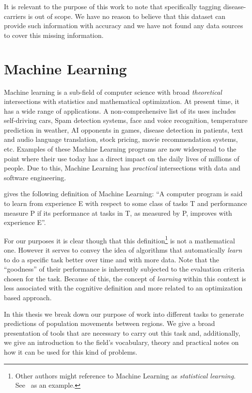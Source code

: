 It is relevant to the purpose of this work to note that specifically tagging disease-carriers is out of scope.
We have no reason to believe that this dataset can provide such information with accuracy and we have not found any data sources to cover this missing  information.

\section{Machine Learning}

Machine learning is a sub-field of computer science with broad \textit{theoretical} intersections with statistics and mathematical optimization.
At present time, it has a wide range of applications.
A non-comprehensive list of its uses includes self-driving cars, Spam detection systems, face and voice recognition, temperature prediction in weather, AI opponents in games, disease detection in patients, text and audio language translation, stock pricing, movie recommendation systems, etc.
Examples of these Machine Learning programs are now widespread to the point where their use today has a direct impact on the daily lives of millions of people.
Due to this, Machine Learning has \textit{practical} intersections with data and software engineering.


\citep{Mitchell-MLearning} gives the following definition of Machine Learning:
``A computer program is said to learn from experience E with respect to some class of tasks T and performance measure P if its performance at tasks in T, as measured by P, improves with experience E''.

For our purposes it is clear though that this definition\footnote{Other authors might reference to Machine Learning as \textit{statistical learning}. See~\citep{hastie-elemstatslearn} as an example.} is not a mathematical one.
However it serves to convey the idea of algorithms that automatically \textit{learn} to do a specific task better over time and with more data.
Note that the ``goodness'' of their performance is inherently subjected to the evaluation criteria chosen for the task.
Because of this, the concept of \textit{learning} within this context is less associated with the cognitive definition and more related to an optimization based approach.

In this thesis we break down our purpose of work into different tasks to generate predictions of population movements between regions.
We give a broad presentation of tools that are necessary to carry out this task and, additionally, we give an introduction to the field's vocabulary, theory and practical notes on how it can be used for this kind of problems.

